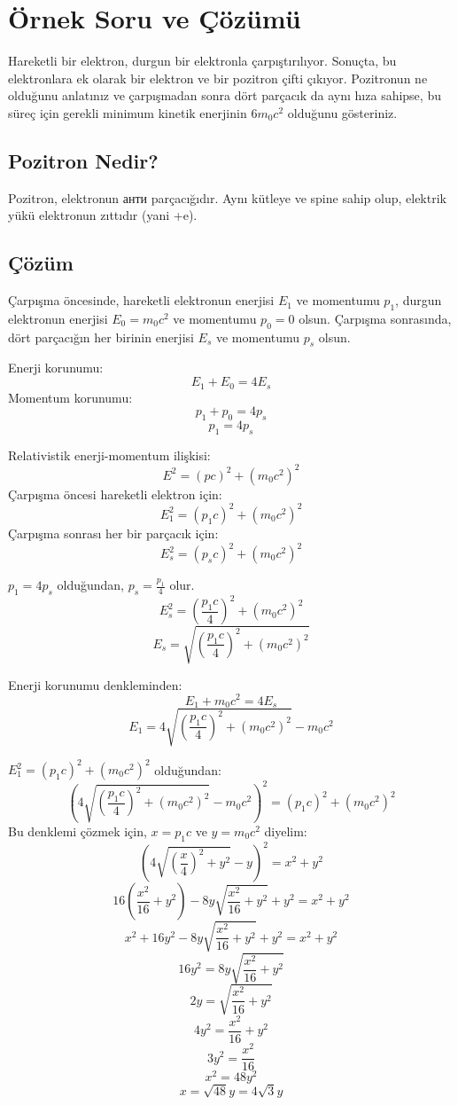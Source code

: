 \documentclass[11pt,letterpaper,twocolumn]{fenbil}
\begin{document}
\section{Örnek Soru ve Çözümü}
Hareketli bir elektron, durgun bir elektronla çarpıştırılıyor. Sonuçta, bu elektronlara ek olarak bir elektron ve bir pozitron çifti çıkıyor. Pozitronun ne olduğunu anlatınız ve çarpışmadan sonra dört parçacık da aynı hıza sahipse, bu süreç için gerekli minimum kinetik enerjinin \( 6m_0c^2 \) olduğunu gösteriniz.

\subsection{Pozitron Nedir?}
Pozitron, elektronun анти parçacığıdır. Aynı kütleye ve spine sahip olup, elektrik yükü elektronun zıttıdır (yani +e).

\subsection{Çözüm}
Çarpışma öncesinde, hareketli elektronun enerjisi \( E_1 \) ve momentumu \( p_1 \), durgun elektronun enerjisi \( E_0 = m_0c^2 \) ve momentumu \( p_0 = 0 \) olsun. Çarpışma sonrasında, dört parçacığın her birinin enerjisi \( E_s \) ve momentumu \( p_s \) olsun.

Enerji korunumu:
\[ E_1 + E_0 = 4E_s \]
Momentum korunumu:
\[ p_1 + p_0 = 4p_s \]
\[ p_1 = 4p_s \]

Relativistik enerji-momentum ilişkisi:
\[ E^2 = (pc)^2 + (m_0c^2)^2 \]
Çarpışma öncesi hareketli elektron için:
\[ E_1^2 = (p_1c)^2 + (m_0c^2)^2 \]
Çarpışma sonrası her bir parçacık için:
\[ E_s^2 = (p_sc)^2 + (m_0c^2)^2 \]

\( p_1 = 4p_s \) olduğundan, \( p_s = \frac{p_1}{4} \) olur.
\[ E_s^2 = \left( \frac{p_1c}{4} \right)^2 + (m_0c^2)^2 \]
\[ E_s = \sqrt{\left( \frac{p_1c}{4} \right)^2 + (m_0c^2)^2} \]

Enerji korunumu denkleminden:
\[ E_1 + m_0c^2 = 4E_s \]
\[ E_1 = 4 \sqrt{\left( \frac{p_1c}{4} \right)^2 + (m_0c^2)^2} - m_0c^2 \]

\( E_1^2 = (p_1c)^2 + (m_0c^2)^2 \) olduğundan:
\[ \left( 4 \sqrt{\left( \frac{p_1c}{4} \right)^2 + (m_0c^2)^2} - m_0c^2 \right)^2 = (p_1c)^2 + (m_0c^2)^2 \]
Bu denklemi çözmek için, \( x = p_1c \) ve \( y = m_0c^2 \) diyelim:
\[ \left( 4 \sqrt{\left( \frac{x}{4} \right)^2 + y^2} - y \right)^2 = x^2 + y^2 \]
\[ 16 \left( \frac{x^2}{16} + y^2 \right) - 8y \sqrt{\frac{x^2}{16} + y^2} + y^2 = x^2 + y^2 \]
\[ x^2 + 16y^2 - 8y \sqrt{\frac{x^2}{16} + y^2} + y^2 = x^2 + y^2 \]
\[ 16y^2 = 8y \sqrt{\frac{x^2}{16} + y^2} \]
\[ 2y = \sqrt{\frac{x^2}{16} + y^2} \]
\[ 4y^2 = \frac{x^2}{16} + y^2 \]
\[ 3y^2 = \frac{x^2}{16} \]
\[ x^2 = 48y^2 \]
\[ x = \sqrt{48}y = 4\sqrt{3}y \]
\end{document}

